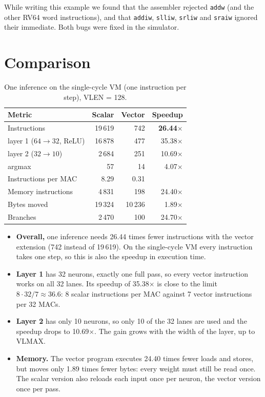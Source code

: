 \documentclass[11pt,a4paper]{article}
\newcommand{\code}[1]{\texttt{#1}}
\begin{document}
While writing this example we found that the assembler rejected \code{addw} (and the other RV64
word instructions), and that \code{addiw}, \code{slliw}, \code{srliw} and \code{sraiw} ignored
their immediate. Both bugs were fixed in the simulator.

\section{Comparison}

\begin{table}[H]
\centering\small
\caption{One inference on the single-cycle VM (one instruction per step), VLEN = 128.}
\label{tab:results}
\begin{tabular}{lrrr}
\toprule
Metric & Scalar & Vector & Speedup \\
\midrule
Instructions                       & 19\,619 & 742 & \textbf{26.44$\times$} \\
\quad layer 1 ($64 \to 32$, ReLU)  & 16\,878 & 477 & 35.38$\times$ \\
\quad layer 2 ($32 \to 10$)        & 2\,684 & 251 & 10.69$\times$ \\
\quad argmax                       & 57 & 14 & 4.07$\times$ \\
Instructions per MAC               & 8.29 & 0.31 & \\
Memory instructions                & 4\,831 & 198 & 24.40$\times$ \\
Bytes moved                        & 19\,324 & 10\,236 & 1.89$\times$ \\
Branches                           & 2\,470 & 100 & 24.70$\times$ \\
\bottomrule
\end{tabular}
\end{table}

\begin{itemize}
  \item \textbf{Overall,} one inference needs 26.44 times fewer instructions with the vector
        extension (742 instead of 19\,619). On the single-cycle VM every instruction takes
        one step, so this is also the speedup in execution time.
  \item \textbf{Layer 1} has 32 neurons, exactly one full pass, so every vector instruction works
        on all 32 lanes. Its speedup of 35.38$\times$ is close to the limit
        $8 \cdot 32 / 7 \approx 36.6$: 8 scalar instructions per MAC against 7 vector instructions
        per 32 MACs.
  \item \textbf{Layer 2} has only 10 neurons, so only 10 of the 32 lanes are used and the speedup
        drops to 10.69$\times$. The gain grows with the width of the layer, up to VLMAX.
  \item \textbf{Memory.} The vector program executes 24.40 times fewer loads and stores, but
        moves only 1.89 times fewer bytes: every weight must still be read once. The scalar
        version also reloads each input once per neuron, the vector version once per pass.
\end{itemize}
\end{document}
